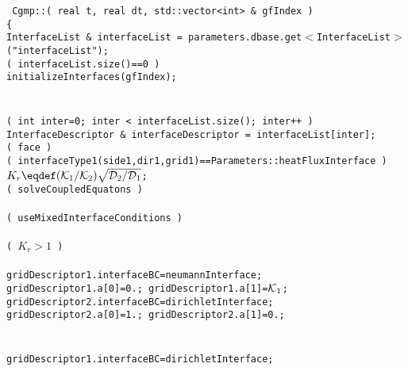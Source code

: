 \begin{flushleft}\tt\small
Cgmp::( real t, real dt, std::vector<int> \& gfIndex  ) \\
\{  \\
\ia  InterfaceList \& interfaceList = parameters.dbase.get$<$InterfaceList$>$("interfaceList"); \\
\ia  \IF( interfaceList.size()==0 ) \\
\ib    initializeInterfaces(gfIndex); \\
\ia  \END \\
\ia \\
\ia  \FOR( int inter=0; inter < interfaceList.size(); inter++ ) \\
\ib    InterfaceDescriptor \& interfaceDescriptor = interfaceList[inter];  \\
\ib    \FOR( face )  \\
\ic      \IF( interfaceType1(side1,dir1,grid1)==Parameters::heatFluxInterface ) \\
\id        $K_r \eqdef (\Kc_1/\Kc_2) \sqrt{\Dc_2/\Dc_1}$;  \\ 
\id        \IF( solveCoupledEquatons )  \\
\ie           {} \\
\id        \ELSEIF( useMixedInterfaceConditions ) \\
\ie           {} \\
\id        \ELSEIF( $K_r > 1$ )   \\
\ie           {} \\
\ie             gridDescriptor1.interfaceBC=neumannInterface;   \\
\ie             gridDescriptor1.a[0]=0.; gridDescriptor1.a[1]=${\mathcal K}_1$; \\
\ie             gridDescriptor2.interfaceBC=dirichletInterface; \\
\ie             gridDescriptor2.a[0]=1.; gridDescriptor2.a[1]=0.;\\
\id        \ELSE \\
\ie           {} \\
\ie           gridDescriptor1.interfaceBC=dirichletInterface;  \\

\end{flushleft}
